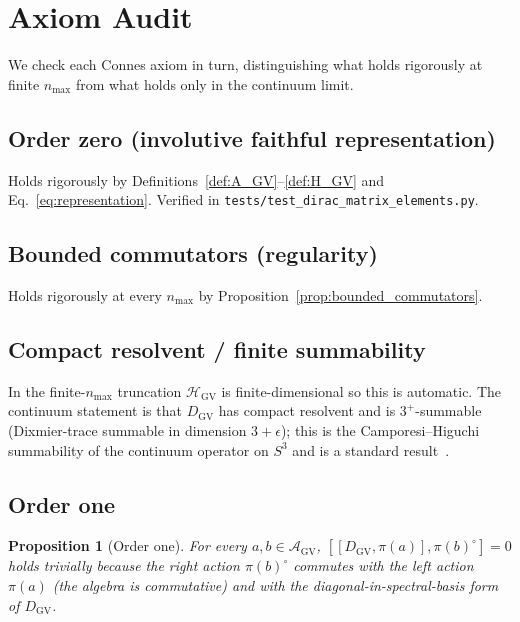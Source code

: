 \documentclass[11pt]{article}
\newtheorem{proposition}{Proposition}
\begin{document}
\section{Axiom Audit}
\label{sec:axiom_audit}

We check each Connes axiom in turn, distinguishing what holds
rigorously at finite $n_{\max}$ from what holds only in the continuum
limit.

\subsection{Order zero (involutive faithful representation)}

Holds rigorously by Definitions~\ref{def:A_GV}--\ref{def:H_GV} and
Eq.~\eqref{eq:representation}.  Verified in
\texttt{tests/test\_dirac\_matrix\_elements.py}.

\subsection{Bounded commutators (regularity)}

Holds rigorously at every $n_{\max}$ by
Proposition~\ref{prop:bounded_commutators}.

\subsection{Compact resolvent / finite summability}

In the finite-$n_{\max}$ truncation $\mathcal{H}_{\mathrm{GV}}$ is
finite-dimensional so this is automatic.  The continuum statement is
that $D_{\mathrm{GV}}$ has compact resolvent and is $3^+$-summable
(Dixmier-trace summable in dimension $3+\epsilon$); this is the
Camporesi--Higuchi summability of the continuum operator on $S^3$ and
is a standard result~\cite{camporesi_higuchi1996,connes1995}.

\subsection{Order one}

\begin{proposition}[Order one]
\label{prop:order_one}
For every $a, b \in \mathcal{A}_{\mathrm{GV}}$,
$[[D_{\mathrm{GV}}, \pi(a)], \pi(b)^{\circ}] = 0$ holds
trivially because the right action $\pi(b)^{\circ}$ commutes with the
left action $\pi(a)$ (the algebra is commutative) and with the
diagonal-in-spectral-basis form of $D_{\mathrm{GV}}$.
\end{proposition}
\end{document}

